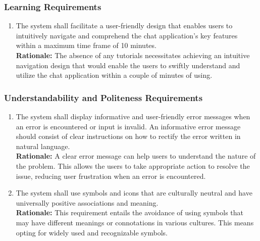 \documentclass[]{article}
\begin{document}
\subsubsection{Learning Requirements}
\label{ssub:learning_requirements}
\begin{enumerate}[{UH-L}1. ]
    \item The system shall facilitate a user-friendly design that enables users to intuitively navigate and comprehend the chat application's key
     features within a maximum time frame of 10 minutes.\\
    {\bf Rationale:} The absence of any tutorials necessitates achieving an intuitive navigation design
    that would enable the users to swiftly understand and utilize the chat application within a couple of minutes of using.
\end{enumerate}
\subsubsection{Understandability and Politeness Requirements}
\label{ssub:understandability_and_politeness_requirements}
\begin{enumerate}[{UH-UP}1. ]
    \item The system shall display informative and user-friendly error messages when an error is encountered or input is invalid. 
    An informative error message should consist of clear instructions on how to rectify the error written in natural language. \\
    {\bf Rationale:} A clear error message can help users to understand the nature of the problem. This allows the users to 
    take appropriate action to resolve the issue, reducing user frustration when an error is encountered.
    \item The system shall use symbols and icons that are culturally neutral and have universally positive associations and meaning.\\
    {\bf Rationale:} This requirement entails the avoidance of using symbols that may have different meanings or connotations
    in various cultures. This means opting for widely used and recognizable symbols.
\end{enumerate}
\end{document}
